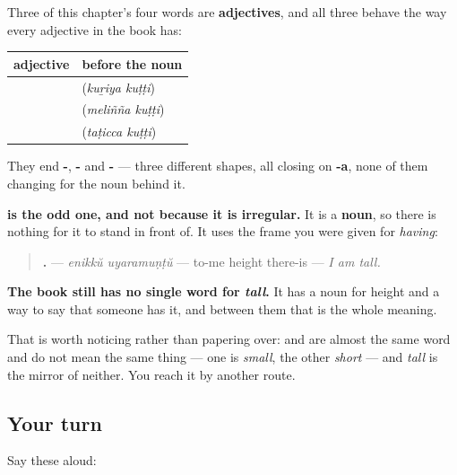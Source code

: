 \begin{grammarlens}[title={Grammar Lens: three of them go in front, and one cannot}]
Three of this chapter's four words are \textbf{adjectives}, and all three behave the way every adjective in the book has:

\noindent
\begin{tabularx}{\linewidth}{@{}>{\raggedright\arraybackslash}X>{\raggedright\arraybackslash}X@{}}
\toprule
\textbf{adjective} & \textbf{before the noun} \\
\midrule
\textbf{\ml{കുറിയ}} & \textbf{\ml{കുറിയ} \ml{കുട്ടി}} (\emph{kuṟiya kuṭṭi}) \\
\textbf{\ml{മെലിഞ്ഞ}} & \textbf{\ml{മെലിഞ്ഞ} \ml{കുട്ടി}} (\emph{meliñña kuṭṭi}) \\
\textbf{\ml{തടിച്ച}} & \textbf{\ml{തടിച്ച} \ml{കുട്ടി}} (\emph{taṭicca kuṭṭi}) \\
\bottomrule
\end{tabularx}

They end \textbf{-}, \textbf{-} and \textbf{-} — three different shapes, all closing on \textbf{-a}, none of them changing for the noun behind it.

\textbf{ is the odd one, and not because it is irregular.} It is a \textbf{noun}, so there is nothing for it to stand in front of. It uses the frame you were given for \emph{having}:

\begin{quote}
\textbf{ .} — \emph{enikkŭ uyaramuṇṭŭ} — to-me height there-is — \emph{I am tall.}
\end{quote}
\end{grammarlens}

\begin{grammarlens}[title={What you've built}]
\textbf{The book still has no single word for \emph{tall}.} It has a noun for height and a way to say that someone has it, and between them that is the whole meaning.

That is worth noticing rather than papering over: \textbf{} and \textbf{} are almost the same word and do not mean the same thing — one is \emph{small}, the other \emph{short} — and \emph{tall} is the mirror of neither. You reach it by another route.
\end{grammarlens}

\subsection*{Your turn}
Say these aloud:


